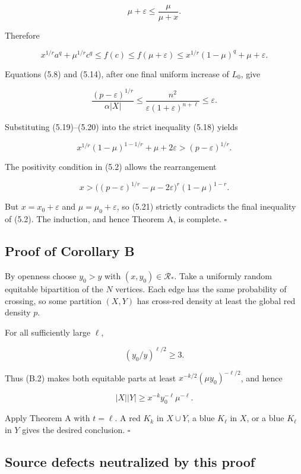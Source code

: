 \[
\mu+\varepsilon\le\frac\mu{\mu+x}.
\]

Therefore

\[
x^{1/r}a^q+\mu^{1/r}c^q
\le f(c)\le f(\mu+\varepsilon)
\le x^{1/r}(1-\mu)^q+\mu+\varepsilon.
\tag{5.19}
\]

Equations (5.8) and (5.14), after one final uniform increase of \(L_0\),
give

\[
\frac{(p-\varepsilon)^{1/r}}{\alpha|X|}
\le\frac{n^2}{\varepsilon(1+\varepsilon)^{n+\ell}}
\le\varepsilon.
\tag{5.20}
\]

Substituting (5.19)--(5.20) into the strict inequality (5.18) yields

\[
x^{1/r}(1-\mu)^{1-1/r}+\mu+2\varepsilon
>(p-\varepsilon)^{1/r}.
\]

The positivity condition in (5.2) allows the rearrangement

\[
x>
\big((p-\varepsilon)^{1/r}-\mu-2\varepsilon\big)^r
(1-\mu)^{1-r}.
\tag{5.21}
\]

But \(x=x_0+\varepsilon\) and \(\mu=\mu_0+\varepsilon\), so (5.21)
strictly contradicts the final inequality of (5.2). The induction, and
hence Theorem A, is complete. \(\square\)

\subsection{Proof of Corollary B}

By openness choose \(y_0>y\) with \((x,y_0)\in\mathcal R_*\). Take a
uniformly random equitable bipartition of the \(N\) vertices. Each edge
has the same probability of crossing, so some partition \((X,Y)\) has
cross-red density at least the global red density \(p\).

For all sufficiently large \(\ell\),

\[
(y_0/y)^{\ell/2}\ge3.
\]

Thus (B.2) makes both equitable parts at least
\(x^{-k/2}(\mu y_0)^{-\ell/2}\), and hence

\[
|X||Y|\ge x^{-k}y_0^{-\ell}\mu^{-\ell}.
\]

Apply Theorem A with \(t=\ell\). A red \(K_k\) in \(X\cup Y\), a blue
\(K_\ell\) in \(X\), or a blue \(K_\ell\) in \(Y\) gives the desired
conclusion. \(\square\)

\subsection{Source defects neutralized by this proof}

